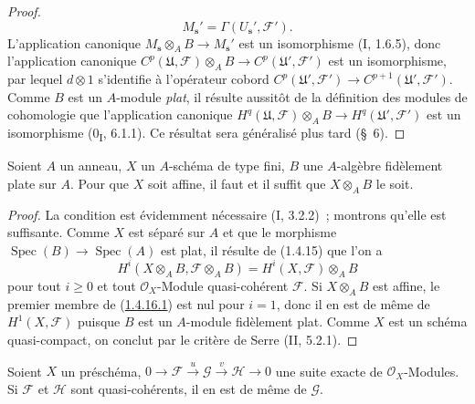 \begin{proof}
\[M_{\mathbf s}'=\Gamma(U_{\mathbf s}',\mathcal F').
\]
L'application canonique
$M_{\mathbf s}\otimes_A B\to M_{\mathbf s}'$ est un isomorphisme
(I, 1.6.5), donc l'application canonique
$C^p(\mathfrak U,\mathcal F)\otimes_A B\to
C^p(\mathfrak U',\mathcal F')$ est un isomorphisme, par lequel
$d\otimes1$ s'identifie à l'opérateur cobord
$C^p(\mathfrak U',\mathcal F')\to C^{p+1}(\mathfrak U',\mathcal F')$.
Comme $B$ est un $A$-module \emph{plat}, il résulte aussitôt de la définition
des modules de cohomologie que l'application canonique
$H^q(\mathfrak U,\mathcal F)\otimes_A B\to
H^q(\mathfrak U',\mathcal F')$ est un isomorphisme
(0\textsubscript{I}, 6.1.1). Ce résultat sera généralisé plus tard (\S~6).
\end{proof}

\begin{corollary}[1.4.16]
\label{III.1.4.16-fr}
Soient $A$ un anneau, $X$ un $A$-schéma de type fini, $B$ une $A$-algèbre
fidèlement plate sur $A$. Pour que $X$ soit affine, il faut et il suffit que
$X\otimes_A B$ le soit.
\end{corollary}

\begin{proof}
La condition est évidemment nécessaire (I, 3.2.2)~; montrons qu'elle est
suffisante. Comme $X$ est séparé sur $A$ et que le morphisme
$\operatorname{Spec}(B)\to\operatorname{Spec}(A)$ est plat, il résulte de
(1.4.15) que l'on a
\begin{equation}
\label{III.1.4.16.1-fr}
\tag{1.4.16.1}
H^i(X\otimes_A B,\mathcal F\otimes_A B)
=H^i(X,\mathcal F)\otimes_A B
\end{equation}
pour tout $i\geq0$ et tout $\mathcal O_X$-Module quasi-cohérent $\mathcal F$.
Si $X\otimes_A B$ est affine, le premier membre de
(\hyperref[III.1.4.16.1-fr]{1.4.16.1}) est nul pour $i=1$, donc il en est de
même de $H^1(X,\mathcal F)$ puisque $B$ est un $A$-module fidèlement plat.
Comme $X$ est un schéma quasi-compact, on conclut par le critère de Serre
(II, 5.2.1).
\end{proof}

\begin{proposition}[1.4.17]
\label{III.1.4.17-fr}
Soient $X$ un préschéma,
$0\to\mathcal F\xrightarrow{u}\mathcal G\xrightarrow{v}\mathcal H\to0$
une suite exacte de $\mathcal O_X$-Modules. Si $\mathcal F$ et $\mathcal H$
sont quasi-cohérents, il en est de même de $\mathcal G$.
\end{proposition}

